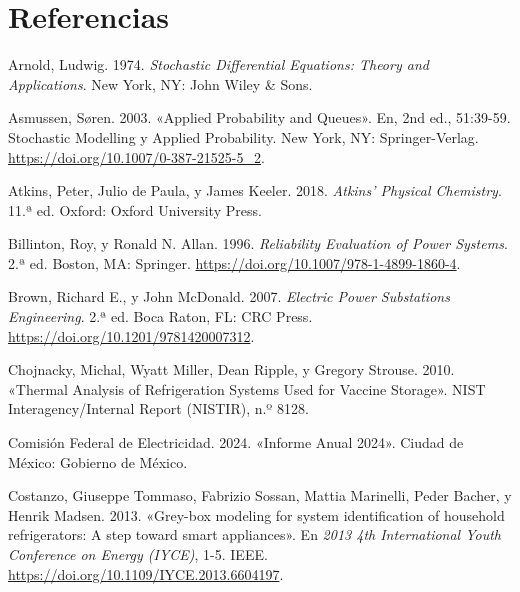 \documentclass[
  spanish,
  us-letterpaper,
]{scrreprt}
\newlength{\cslhangindent}
\newenvironment{CSLReferences}[2] %
 {\begin{list}{}{%
  \setlength{\itemindent}{0pt}
  \setlength{\leftmargin}{0pt}
  \setlength{\parsep}{0pt}
  \ifodd #1
   \setlength{\leftmargin}{\cslhangindent}
   \setlength{\itemindent}{-1\cslhangindent}
  \fi
  \setlength{\itemsep}{#2\baselineskip}}}
 {\end{list}}
\numberwithin{equation}{section}
\theoremstyle{plain}
\theoremstyle{plain}
\theoremstyle{definition}
\theoremstyle{plain}
\theoremstyle{remark}
\begin{document}

\chapter*{Referencias}\label{referencias}


\label{refs}
\begin{CSLReferences}{1}{0}
Arnold, Ludwig. 1974. \emph{Stochastic Differential Equations: Theory
and Applications}. New York, NY: John Wiley \& Sons.

Asmussen, Søren. 2003. {«Applied Probability and Queues»}. En, 2nd ed.,
51:39-59. Stochastic Modelling y Applied Probability. New York, NY:
Springer-Verlag. \url{https://doi.org/10.1007/0-387-21525-5_2}.

Atkins, Peter, Julio de Paula, y James Keeler. 2018. \emph{Atkins'
Physical Chemistry}. 11.ª ed. Oxford: Oxford University Press.

Billinton, Roy, y Ronald N. Allan. 1996. \emph{Reliability Evaluation of
Power Systems}. 2.ª ed. Boston, MA: Springer.
\url{https://doi.org/10.1007/978-1-4899-1860-4}.

Brown, Richard E., y John McDonald. 2007. \emph{Electric Power
Substations Engineering}. 2.ª ed. Boca Raton, FL: CRC Press.
\url{https://doi.org/10.1201/9781420007312}.

Chojnacky, Michal, Wyatt Miller, Dean Ripple, y Gregory Strouse. 2010.
{«Thermal Analysis of Refrigeration Systems Used for Vaccine Storage»}.
NIST Interagency/Internal Report (NISTIR), n.º 8128.

Comisión Federal de Electricidad. 2024. {«Informe Anual 2024»}. Ciudad
de México: Gobierno de México.

Costanzo, Giuseppe Tommaso, Fabrizio Sossan, Mattia Marinelli, Peder
Bacher, y Henrik Madsen. 2013. {«Grey-box modeling for system
identification of household refrigerators: A step toward smart
appliances»}. En \emph{2013 4th International Youth Conference on Energy
(IYCE)}, 1-5. IEEE. \url{https://doi.org/10.1109/IYCE.2013.6604197}.


\end{CSLReferences}
\end{document}
